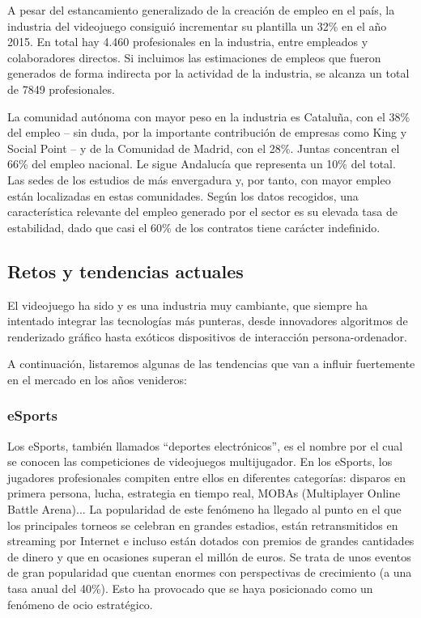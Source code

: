 A pesar del estancamiento generalizado de la creación de empleo en el país, la industria del videojuego consiguió incrementar su plantilla un 32\% en el año 2015. En total hay 4.460 profesionales en la industria, entre empleados y colaboradores directos. Si incluimos las estimaciones de empleos que fueron generados de forma indirecta por la actividad de la industria, se alcanza un total de 7849 profesionales.

La comunidad autónoma con mayor peso en la industria es Cataluña, con el 38\% del empleo – sin duda, por la importante contribución de empresas como King y Social Point – y de la Comunidad de Madrid, con el 28\%. Juntas concentran el 66\% del empleo nacional. Le sigue Andalucía que representa un 10\% del total. Las sedes de los estudios de más envergadura y, por tanto, con mayor empleo están localizadas en estas comunidades. Según los datos recogidos, una característica relevante del empleo generado por el sector es su elevada tasa de estabilidad, dado que casi el 60\% de los contratos tiene carácter indefinido.

\subsection{Retos y tendencias actuales}
El videojuego ha sido y es una industria muy cambiante, que siempre ha intentado integrar las tecnologías más punteras, desde innovadores algoritmos de renderizado gráfico hasta exóticos dispositivos de interacción persona-ordenador.

A continuación, listaremos algunas de las tendencias que van a influir fuertemente en el mercado en los años venideros:

\subsubsection{eSports}
Los eSports, también llamados ``deportes electrónicos'', es el nombre por el cual se conocen las competiciones de videojuegos multijugador. En los eSports, los jugadores profesionales compiten entre ellos en diferentes categorías: disparos en primera persona, lucha, estrategia en tiempo real, MOBAs (Multiplayer Online Battle Arena)... La popularidad de este fenómeno ha llegado al punto en el que los principales torneos se celebran en grandes estadios, están retransmitidos en streaming por Internet e incluso están dotados con premios de grandes cantidades de dinero y que en ocasiones superan el millón de euros. Se trata de unos eventos de gran popularidad que cuentan enormes con perspectivas de crecimiento (a una tasa anual del 40\%). Esto ha provocado que se haya posicionado como un fenómeno de ocio estratégico.

